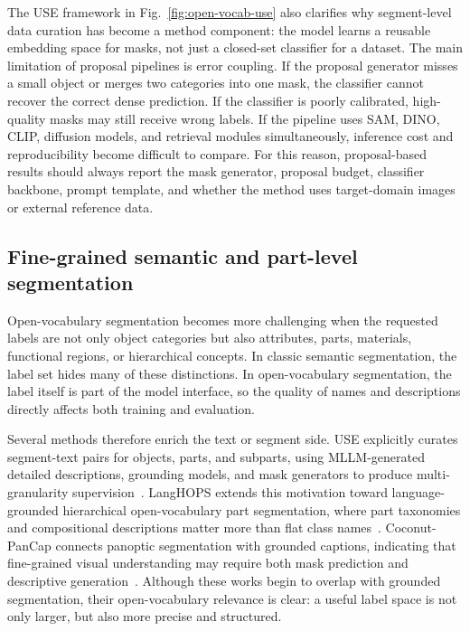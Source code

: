 The USE framework in Fig.~\ref{fig:open-vocab-use} also clarifies why segment-level data curation has become a method component: the model learns a reusable embedding space for masks, not just a closed-set classifier for a dataset. The main limitation of proposal pipelines is error coupling. If the proposal generator misses a small object or merges two categories into one mask, the classifier cannot recover the correct dense prediction. If the classifier is poorly calibrated, high-quality masks may still receive wrong labels. If the pipeline uses SAM, DINO, CLIP, diffusion models, and retrieval modules simultaneously, inference cost and reproducibility become difficult to compare. For this reason, proposal-based results should always report the mask generator, proposal budget, classifier backbone, prompt template, and whether the method uses target-domain images or external reference data.

\subsection{Fine-grained semantic and part-level segmentation}

Open-vocabulary segmentation becomes more challenging when the requested labels are not only object categories but also attributes, parts, materials, functional regions, or hierarchical concepts. In classic semantic segmentation, the label set hides many of these distinctions. In open-vocabulary segmentation, the label itself is part of the model interface, so the quality of names and descriptions directly affects both training and evaluation.

Several methods therefore enrich the text or segment side. USE explicitly curates segment-text pairs for objects, parts, and subparts, using MLLM-generated detailed descriptions, grounding models, and mask generators to produce multi-granularity supervision~\citep{xwangUseUniversalSegment2024}. LangHOPS extends this motivation toward language-grounded hierarchical open-vocabulary part segmentation, where part taxonomies and compositional descriptions matter more than flat class names~\citep{ymiaoLanghopsLanguageGrounded2026}. Coconut-PanCap connects panoptic segmentation with grounded captions, indicating that fine-grained visual understanding may require both mask prediction and descriptive generation~\citep{dengCoconutpancapJointPanoptic2026}. Although these works begin to overlap with grounded segmentation, their open-vocabulary relevance is clear: a useful label space is not only larger, but also more precise and structured.

